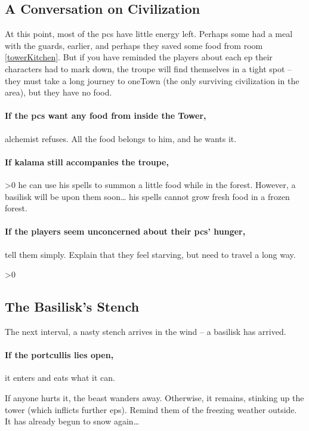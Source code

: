 \begin{multicols}{2}

\subsection{A Conversation on Civilization}

At this point, most of the \glspl{pc} have little energy left.
Perhaps some had a meal with the \glspl{guard}, earlier, and perhaps they saved some food from room \ref{towerKitchen}.
But if you have reminded the players about each \gls{ep} their characters had to mark down, the troupe will find themselves in a tight spot -- they must take a long journey to \gls{oneTown} (the only surviving civilization in the area), but they have no food.

\paragraph{If the \glspl{pc} want any food from inside the Tower,}
\gls{alchemist} refuses.
All the food belongs to him, and he wants it.

\paragraph{If \gls{kalama} still accompanies the troupe,}
\ifnum\value{temperature}>0
  he can use his spells to summon a little food while in the forest.
  However, a basilisk will be upon them soon\ldots
\else%
  his spells cannot grow fresh food in a frozen forest.
\fi

\paragraph{If the players seem unconcerned about their \glspl{pc}' hunger,}
tell them simply.
Explain that they feel starving, but need to travel a long way.

\ifnum\value{temperature}>0%
  \subsection{The Basilisk's Stench}

  The next \gls{interval}, a nasty stench arrives in the wind -- a basilisk has arrived.

  \paragraph{If the portcullis lies open,}
  it enters and eats what it can.

  If anyone hurts it, the beast wanders away.
  Otherwise, it remains, stinking up the tower (which inflicts further \glspl{ep}).
  \basilisk
\else
  Remind them of the freezing weather outside.
  It has already begun to snow again\ldots
\fi

\end{multicols}
